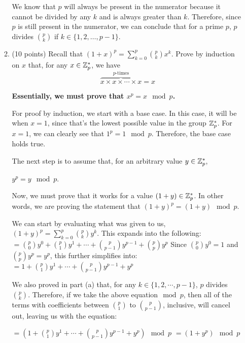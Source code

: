 \documentclass[11pt]{article}
\begin{document}
\begin{enumerate}
\begin{enumerate}
{      We know that $p$ will always be present in the numerator because it cannot be divided by any $k$ and is always greater than $k$. Therefore, since $p$ is still present in the numerator, we can conclude that for a prime $p$, $p$ divides $\binom pk$ if $k\in\{1,2,\dotsc,p-1\}$.
  }
   \newpage
  \item(10 points) Recall that $(1+x)^p = \sum_{k=0}^p \binom pk x^k$. 
    Prove by induction on $x$ that, for any $x\in{\mathbb Z}_p^*$, we have  
      $$\overbrace{x\times x \times \dotsi \times x}^{p\text{-times}}=x$$\newline
  {\bfseries
      Essentially, we must prove that $x^p = x\mod p$. \newline

      For proof by induction, we start with a base case. In this case, it will be when $x=1$, since that's the lowest possible value in the group ${\mathbb Z}_p^*$. For $x=1$, we can clearly see that $1^p = 1\mod p$. Therefore, the base case holds true. \newline

      The next step is to assume that, for an arbitrary value $y\in {\mathbb Z}_p^*$,

      $y^p= y\mod p$.

      Now, we must prove that it works for a value $(1+y)\in {\mathbb Z}_p^*$. In other words, we are proving the statement that $(1+y)^p = (1+y)\mod p$. \newline


      We can start by evaluating what was given to us, $(1+y)^p = \sum_{k=0}^p \binom pk y^k$. This expands into the following: \newline
      $ = \binom p0 y^0 + \binom p1 y^1 + \dotsi + \binom{p}{p-1} y^{p-1} + \binom pp y^p$ \newline
      Since $\binom p0 y^0 = 1$ and $\binom pp y^p = y^p$, this further simplifies into: \newline
      $=1 + \binom p1 y^1 + \dotsi + \binom{p}{p-1} y^{p-1} + y^p$ \newline

      We also proved in part (a) that, for any $k\in \{1,2,\dotsi,p-1\}$, $p$ divides $\binom pk$. Therefore, if we take the above equation$\mod p$, then all of the terms with coefficients between $\binom p1$ to $\binom p{p-1}$, inclusive, will cancel out, leaving us with the equation: \newline

      $=(1 + \binom p1 y^1 + \dotsi + \binom{p}{p-1} y^{p-1} + y^p) \mod p$ \newline
      $=(1+y^p) \mod p$ \newline

}
\end{enumerate}
\end{enumerate}
\end{document}
